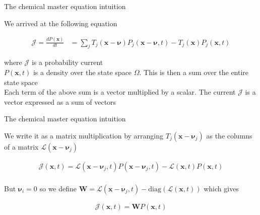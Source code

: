 \documentclass{beamer}					%
\begin{document}
\begin{frame}{The chemical master equation intuition}

We arrived at the following equation

\begin{align*}
\mathcal{J} = \frac{dP(\bm{x})}{dt} &= \sum_{j}T_{j}(\bm{x}-\bm{\nu})P_{j}(\bm{x}-\bm{\nu},t) - T_{j}(\bm{x})P_{j}(\bm{x},t)
\end{align*}

where $\mathcal{J}$ is a probability current\\
\vspace{0.1in}
$P(\bm{x},t)$ is a density over the state space $\Omega$. This is then a sum over the entire state space\\
\vspace{0.1in}
Each term of the above sum is a vector multiplied by a scalar. The current $\mathcal{J}$ is a vector expressed as a sum of vectors
\vspace{0.1in}


\end{frame}

\begin{frame}{The chemical master equation intuition}

We write it as a matrix multiplication by arranging $T_{j}(\bm{x}-\bm{\nu}_{j})$ as the columns of a matrix $\mathcal{L}(\bm{x}-\bm{\nu}_{j})$

\begin{align*}
\mathcal{J}(\mathbf{x},t) = \mathcal{L}(\bm{x}-\bm{\nu}_{j},t)P(\bm{x}-\bm{\nu}_{j},t) -  \mathcal{L}(\bm{x},t)P(\bm{x},t)
\end{align*}
\\
\vspace{0.2in}
But $\bm{\nu}_{i} = 0$ so we define $\mathbf{W} = \mathcal{L}(\bm{x}-\bm{\nu}_{j},t) - \mathrm{diag}\left( \mathcal{L}(\bm{x},t)\right)$ which gives

\begin{align*}
\mathcal{J}(\mathbf{x},t) = \mathbf{W}P(\bm{x},t)
\end{align*}

\end{frame}
\end{document}
